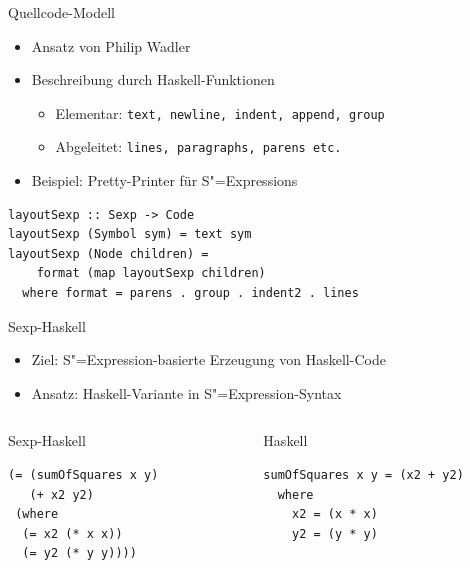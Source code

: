 \documentclass{beamer}
\newcommand{\sexp}{S"=Expression}
\newcommand{\sexps}{S"=Expressions}
\begin{document}
\begin{frame}[fragile]{Quellcode-Modell}
  \begin{itemize}
  \item Ansatz von Philip Wadler
  \item Beschreibung durch Haskell-Funktionen
    \begin{itemize}
    \item Elementar: \verb+text, newline, indent, append, group+
    \item Abgeleitet: \verb+lines, paragraphs, parens etc.+
    \end{itemize}
  \item Beispiel: Pretty-Printer für \sexps{}
  \end{itemize}
\begin{verbatim}
layoutSexp :: Sexp -> Code
layoutSexp (Symbol sym) = text sym
layoutSexp (Node children) = 
    format (map layoutSexp children)
  where format = parens . group . indent2 . lines
\end{verbatim}
\end{frame}

\begin{frame}[fragile]{Sexp-Haskell}
  \begin{itemize}
  \item Ziel: \sexp{}-basierte Erzeugung von Haskell-Code
  \item Ansatz: Haskell-Variante in \sexp{}-Syntax
  \end{itemize}
  \begin{columns}
    \begin{column}{5cm}
      \begin{block}{Sexp-Haskell}
\begin{verbatim}
(= (sumOfSquares x y)
   (+ x2 y2)
 (where                   
  (= x2 (* x x))
  (= y2 (* y y))))
\end{verbatim}
      \end{block}
    \end{column}
    \begin{column}{6cm}
      \begin{block}{Haskell}
\begin{verbatim}
sumOfSquares x y = (x2 + y2)
  where
    x2 = (x * x)         
    y2 = (y * y)
\end{verbatim}
      \end{block}
    \end{column}
  \end{columns}
\end{frame}
\end{document}
